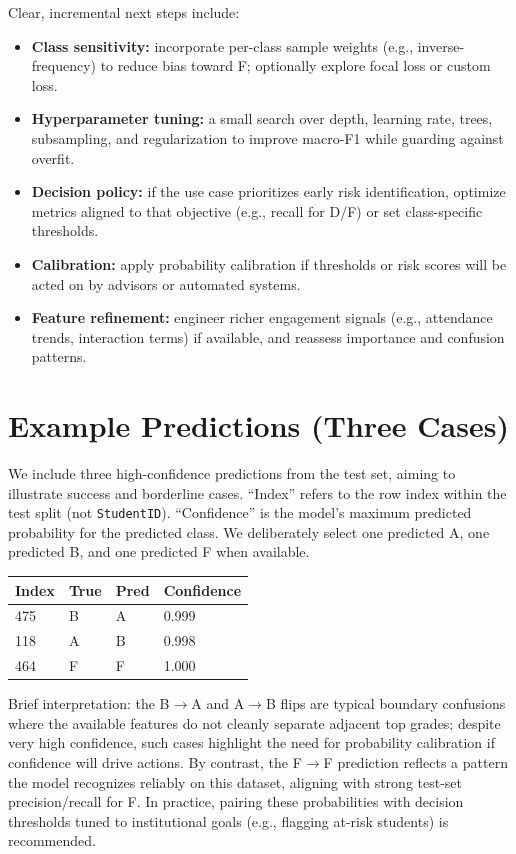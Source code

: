 \documentclass[11pt]{article}
\begin{document}
Clear, incremental next steps include:
\begin{itemize}[leftmargin=*]
  \item \textbf{Class sensitivity:} incorporate per-class sample weights (e.g., inverse-frequency) to reduce bias toward F; optionally explore focal loss or custom loss.
  \item \textbf{Hyperparameter tuning:} a small search over depth, learning rate, trees, subsampling, and regularization to improve macro-F1 while guarding against overfit.
  \item \textbf{Decision policy:} if the use case prioritizes early risk identification, optimize metrics aligned to that objective (e.g., recall for D/F) or set class-specific thresholds.
  \item \textbf{Calibration:} apply probability calibration if thresholds or risk scores will be acted on by advisors or automated systems.
  \item \textbf{Feature refinement:} engineer richer engagement signals (e.g., attendance trends, interaction terms) if available, and reassess importance and confusion patterns.
\end{itemize}

\section*{Example Predictions (Three Cases)}
We include three high-confidence predictions from the test set, aiming to illustrate success and borderline cases. ``Index'' refers to the row index within the test split (not \texttt{StudentID}). ``Confidence'' is the model's maximum predicted probability for the predicted class. We deliberately select one predicted A, one predicted B, and one predicted F when available.

\begin{center}
\begin{tabular}{l l l l}
\toprule
Index & True & Pred & Confidence \\
\midrule
475 & B & A & 0.999 \\
118 & A & B & 0.998 \\
464 & F & F & 1.000 \\
\bottomrule
\end{tabular}
\end{center}

Brief interpretation: the B$\to$A and A$\to$B flips are typical boundary confusions where the available features do not cleanly separate adjacent top grades; despite very high confidence, such cases highlight the need for probability calibration if confidence will drive actions. By contrast, the F$\to$F prediction reflects a pattern the model recognizes reliably on this dataset, aligning with strong test-set precision/recall for F. In practice, pairing these probabilities with decision thresholds tuned to institutional goals (e.g., flagging at-risk students) is recommended.
\end{document}
